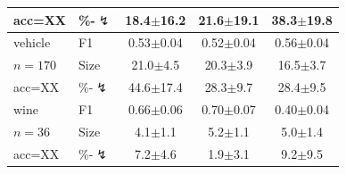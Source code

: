 \begin{tabular}{llccc}
acc=XX & \%-$\lightning$ & 18.4{\scriptsize$\pm$16.2} & 21.6{\scriptsize$\pm$19.1} & 38.3{\scriptsize$\pm$19.8} \\
\midrule
vehicle & F1 & 0.53{\scriptsize$\pm$0.04} & 0.52{\scriptsize$\pm$0.04} & 0.56{\scriptsize$\pm$0.04} \\
$n=170$ & Size & 21.0{\scriptsize$\pm$4.5} & 20.3{\scriptsize$\pm$3.9} & 16.5{\scriptsize$\pm$3.7} \\
acc=XX & \%-$\lightning$ & 44.6{\scriptsize$\pm$17.4} & 28.3{\scriptsize$\pm$9.7} & 28.4{\scriptsize$\pm$9.5} \\
\midrule
wine & F1 & 0.66{\scriptsize$\pm$0.06} & 0.70{\scriptsize$\pm$0.07} & 0.40{\scriptsize$\pm$0.04} \\
$n=36$ & Size & 4.1{\scriptsize$\pm$1.1} & 5.2{\scriptsize$\pm$1.1} & 5.0{\scriptsize$\pm$1.4} \\
acc=XX & \%-$\lightning$ & 7.2{\scriptsize$\pm$4.6} & 1.9{\scriptsize$\pm$3.1} & 9.2{\scriptsize$\pm$9.5} \\
\bottomrule
\end{tabular}